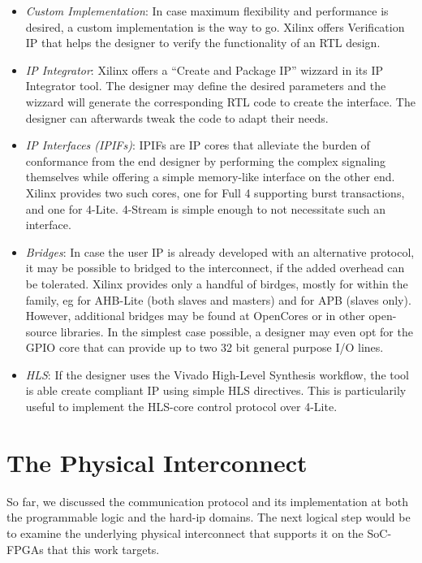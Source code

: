 \begin{itemize}
\item	\emph{Custom Implementation}:
	In case maximum flexibility and performance is desired,
	a custom implementation is the way to go. 
	Xilinx offers  Verification IP that helps the designer to verify the functionality
	of an RTL design.
\item	\emph{IP Integrator}:
	Xilinx offers a ``Create and Package IP'' wizzard in its IP Integrator tool.
	The designer may define the desired  parameters 
	and the wizzard will generate the corresponding RTL code
	to create the  interface. The designer can afterwards tweak the code to adapt their needs.
\item	\emph{IP Interfaces (IPIFs)}:
	IPIFs are IP cores that alleviate the burden of  conformance from the end designer
	by performing the complex  signaling themselves while offering a simple memory-like
	interface on the other end. Xilinx provides two such cores, one for Full 4 supporting
	burst transactions, and one for 4-Lite. 
	4-Stream is simple enough to not necessitate such an interface.
\item	\emph{Bridges}: In case the user IP is already developed with an alternative protocol,
	it may be possible to bridged to the  interconnect, 
	if the added overhead can be tolerated.
	Xilinx provides only a handful of birdges, 
	mostly for within the  family, 
	eg for AHB-Lite (both slaves and masters) and for APB (slaves only). 
	However, additional bridges may be found at OpenCores
	or in other open-source libraries. 
	In the simplest case possible, a designer may even opt for 
	the  GPIO core that can provide up to two 32 bit general purpose I/O lines.
\item	\emph{HLS}: If the designer uses the Vivado High-Level Synthesis workflow,
	the tool is able create  compliant IP using simple HLS directives. 
	This is particularily useful to implement
	the HLS-core control protocol over 4-Lite.
\end{itemize}

\section{The Physical Interconnect}

So far, we discussed the communication protocol and its implementation at both 
the programmable logic and the hard-ip domains.
The next logical step would be to examine the underlying physical interconnect
that supports it on the SoC-FPGAs that this work targets. 

